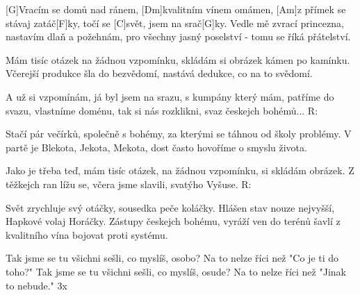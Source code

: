 
[G]Vracím se domů nad ránem, [Dm]kvalitním vínem omámen,
[Am]z přímek se stávaj zatáč[F]ky, točí se [C]svět, jsem na srač[G]ky.
Vedle mě zvrací princezna, nastavím dlaň a požehnám,
pro všechny jasný poselství - tomu se říká přátelství.

Mám tisíc otázek na žádnou vzpomínku,
skládám si obrázek kámen po kamínku.
Včerejší produkce šla do bezvědomí,
nastává dedukce, co na to svědomí.

A už si vzpomínám, já byl jsem na srazu,
s kumpány který mám, patříme do svazu,
vlastníme doménu, tak si nás rozklikni,
svaz českejch bohémů...
R:

Stačí pár večírků, společně s bohémy,
za kterými se táhnou od školy problémy.
V partě je Blekota, Jekota, Mekota,
dost často hovoříme o smyslu života.

Jako je třeba teď, mám tisíc otázek,
na žádnou vzpomínku, si skládám obrázek.
Z těžkejch ran lížu se, včera jsme slavili,
svatýho Vyšuse.
R:

Svět zrychluje svý otáčky, sousedka peče koláčky.
Hlášen stav nouze nejvyšší, Hapkové volaj Horáčky.
Zástupy českejch bohému, vyráží ven do terénů
šavlí z kvalitního vína bojovat proti systému.

Tak jsme se tu všichni sešli, co myslíš, osobo?
Na to nelze říci než "Co je ti do toho?"
Tak jsme se tu všichni sešli, co myslíš, osude?
Na to nelze říci než "Jinak to nebude." 3x

